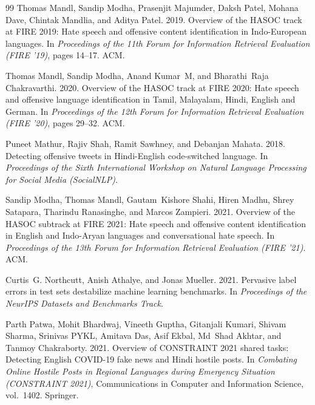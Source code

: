 \documentclass[11pt,a4paper]{article}
\begin{document}
\begin{thebibliography}{99}
Thomas Mandl, Sandip Modha, Prasenjit Majumder, Daksh Patel, Mohana Dave, Chintak Mandlia, and Aditya Patel. 2019.
\newblock Overview of the {HASOC} track at {FIRE} 2019: Hate speech and offensive content identification in {Indo-European} languages.
\newblock In \emph{Proceedings of the 11th Forum for Information Retrieval Evaluation (FIRE '19)}, pages 14--17. ACM.

Thomas Mandl, Sandip Modha, Anand Kumar~M, and Bharathi~Raja Chakravarthi. 2020.
\newblock Overview of the {HASOC} track at {FIRE} 2020: Hate speech and offensive language identification in {Tamil}, {Malayalam}, {Hindi}, {English} and {German}.
\newblock In \emph{Proceedings of the 12th Forum for Information Retrieval Evaluation (FIRE '20)}, pages 29--32. ACM.

Puneet Mathur, Rajiv Shah, Ramit Sawhney, and Debanjan Mahata. 2018.
\newblock Detecting offensive tweets in {Hindi-English} code-switched language.
\newblock In \emph{Proceedings of the Sixth International Workshop on Natural Language Processing for Social Media (SocialNLP)}.

Sandip Modha, Thomas Mandl, Gautam~Kishore Shahi, Hiren Madhu, Shrey Satapara, Tharindu Ranasinghe, and Marcos Zampieri. 2021.
\newblock Overview of the {HASOC} subtrack at {FIRE} 2021: Hate speech and offensive content identification in {English} and {Indo-Aryan} languages and conversational hate speech.
\newblock In \emph{Proceedings of the 13th Forum for Information Retrieval Evaluation (FIRE '21)}. ACM.

Curtis~G. Northcutt, Anish Athalye, and Jonas Mueller. 2021.
\newblock Pervasive label errors in test sets destabilize machine learning benchmarks.
\newblock In \emph{Proceedings of the NeurIPS Datasets and Benchmarks Track}.

Parth Patwa, Mohit Bhardwaj, Vineeth Guptha, Gitanjali Kumari, Shivam Sharma, Srinivas PYKL, Amitava Das, Asif Ekbal, Md~Shad Akhtar, and Tanmoy Chakraborty. 2021.
\newblock Overview of {CONSTRAINT} 2021 shared tasks: Detecting {English} {COVID-19} fake news and {Hindi} hostile posts.
\newblock In \emph{Combating Online Hostile Posts in Regional Languages during Emergency Situation (CONSTRAINT 2021)}, Communications in Computer and Information Science, vol.\ 1402. Springer.


\end{thebibliography}
\end{document}
